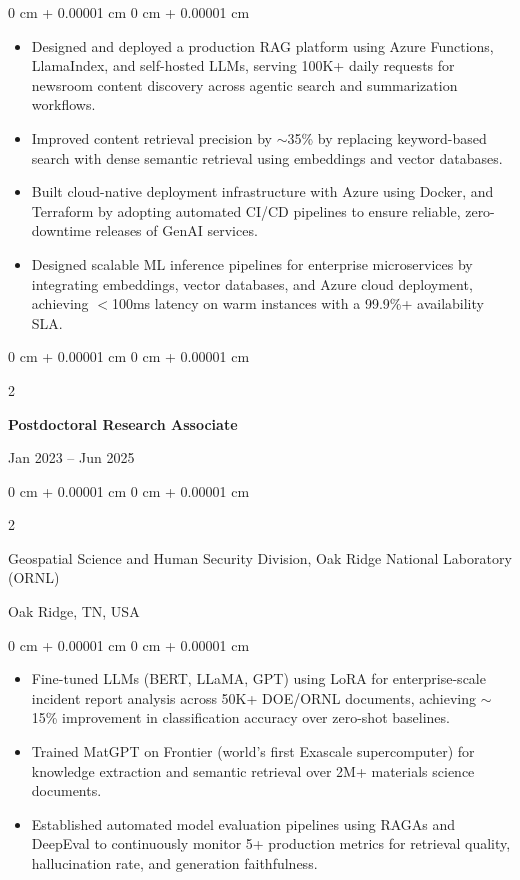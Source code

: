 \documentclass[10pt, letterpaper]{article}
\newenvironment{highlights}{
    \begin{itemize}[
        topsep=0.10 cm,
        parsep=0.10 cm,
        partopsep=0pt,
        itemsep=0pt,
        leftmargin=0 cm + 10pt
    ]
}{
    \end{itemize}
} %
\newenvironment{onecolentry}{
    \begin{adjustwidth}{
        0 cm + 0.00001 cm
    }{
        0 cm + 0.00001 cm
    }
}{
    \end{adjustwidth}
} %
\newenvironment{twocolentry}[2][]{
    \onecolentry
    \def\secondColumn{#2}
    \setcolumnwidth{\fill, 4.5 cm}
    \begin{paracol}{2}
}{
    \switchcolumn \raggedleft \secondColumn
    \end{paracol}
    \endonecolentry
} %
\begin{document}
    \begin{onecolentry}
        \begin{highlights}
            \item Designed and deployed a production RAG platform using Azure Functions, LlamaIndex, and self-hosted LLMs, serving 100K+ daily requests for newsroom content discovery across agentic search and summarization workflows.
            \item Improved content retrieval precision by $\sim$35\% by replacing keyword-based search with dense semantic retrieval using embeddings and vector databases.
            \item Built cloud-native deployment infrastructure with Azure using Docker, and Terraform by adopting automated CI/CD pipelines to ensure reliable, zero-downtime releases of GenAI services.
            \item Designed scalable ML inference pipelines for enterprise microservices by integrating embeddings, vector databases, and Azure cloud deployment, achieving $<$100ms latency on warm instances with a 99.9\%+ availability SLA.
        \end{highlights}
    \end{onecolentry}

    \vspace{1mm}

    \begin{twocolentry}{Jan 2023 -- Jun 2025}
        \textbf{Postdoctoral Research Associate}
    \end{twocolentry}
    \begin{twocolentry}{Oak Ridge, TN, USA}
        Geospatial Science and Human Security Division, Oak Ridge National Laboratory (ORNL)
    \end{twocolentry}
    \vspace{0.10 cm}
    \begin{onecolentry}
        \begin{highlights}
            \item Fine-tuned LLMs (BERT, LLaMA, GPT) using LoRA for enterprise-scale incident report analysis across 50K+ DOE/ORNL documents, achieving $\sim$15\% improvement in classification accuracy over zero-shot baselines.
            \item Trained MatGPT on Frontier (world's first Exascale supercomputer) for knowledge extraction and semantic retrieval over 2M+ materials science documents.
            \item Established automated model evaluation pipelines using RAGAs and DeepEval to continuously monitor 5+ production metrics for retrieval quality, hallucination rate, and generation faithfulness.
        \end{highlights}
    \end{onecolentry}
\end{document}
